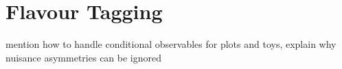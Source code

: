\section{Flavour Tagging}
\label{sec:ana_tagging}
mention how to handle conditional observables for plots and toys,
explain why nuisance asymmetries can be ignored


